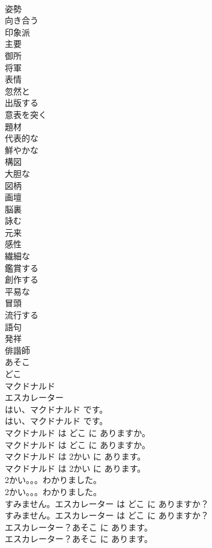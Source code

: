 \documentclass[8pt]{extreport}
\begin{document}
\begin{CJK}{UTF8}{min}
\\	姿勢
\\	向き合う
\\	印象派
\\	主要
\\	御所
\\	将軍
\\	表情
\\	忽然と
\\	出版する
\\	意表を突く
\\	題材
\\	代表的な
\\	鮮やかな
\\	構図
\\	大胆な
\\	図柄
\\	画壇
\\	脳裏
\\	詠む
\\	元来
\\	感性
\\	繊細な
\\	鑑賞する
\\	創作する
\\	平易な
\\	冒頭
\\	流行する
\\	語句
\\	発祥
\\	俳諧師
\\	あそこ
\\	どこ
\\	マクドナルド
\\	エスカレーター
\\	はい、マクドナルド です。	
\\	はい、マクドナルド です。 
\\	マクドナルド は どこ に ありますか。	
\\	マクドナルド は どこ に ありますか。 
\\	マクドナルド は 2かい に あります。	
\\	マクドナルド は 2かい に あります。 
\\	2かい。。。わかりました。	
\\	2かい。。。わかりました。 
\\	すみません。エスカレーター は どこ に ありますか？	
\\	すみません。エスカレーター は どこ に ありますか？ 
\\	エスカレーター？あそこ に あります。	
\\	エスカレーター？あそこ に あります。 

\end{CJK}
\end{document}
